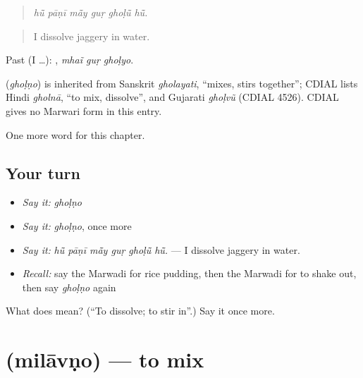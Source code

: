 \begin{quote}
     
\end{quote}

\begin{quote}
\emph{hū̃ pāṇī mā̃y guṛ ghoḷū̃ hū̃.}
\end{quote}

\begin{quote}
I dissolve jaggery in water.
\end{quote}

Past (I …):   , \emph{mhaĩ guṛ ghoḷyo}.

\begin{cousinweb}
\textbf{} (\emph{ghoḷṇo}) is inherited from Sanskrit \emph{gholayati}, \textquotedblleft{}mixes, stirs together\textquotedblright{}; CDIAL lists Hindi \emph{gholnā}, \textquotedblleft{}to mix, dissolve\textquotedblright{}, and Gujarati \emph{ghoḷvũ} (CDIAL 4526). CDIAL gives no Marwari form in this entry.
\end{cousinweb}

\begin{grammarlens}[title={What you've built}]
One more word for this chapter.
\end{grammarlens}

\subsection*{Your turn}
\begin{itemize}
\raggedright
  \item \emph{Say it:} \emph{ghoḷṇo}
  \item \emph{Say it:} \emph{ghoḷṇo}, once more
  \item \emph{Say it:} \emph{hū̃ pāṇī mā̃y guṛ ghoḷū̃ hū̃.} — I dissolve jaggery in water.
  \item \emph{Recall:} say the Marwadi for rice pudding, then the Marwadi for to shake out, then say \emph{ghoḷṇo} again
\end{itemize}

\begin{tcolorbox}[breakable,colback=teal!4,colframe=teal!35!black,title={Before you move on}]
What does  mean? (\textquotedblleft{}To dissolve; to stir in\textquotedblright{}.) Say it once more.
\end{tcolorbox}
\section[\texorpdfstring{\mw{मिलावणो} (milāvṇo)}{मिलावणो (milāvṇo)}]{ (milāvṇo) — to mix}

